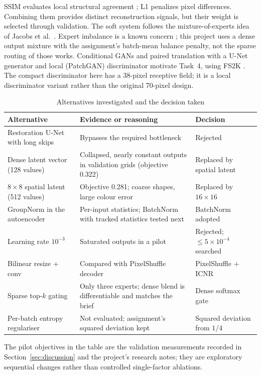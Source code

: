 \documentclass[conference]{IEEEtran}
\begin{document}
SSIM evaluates local structural agreement \cite{wang}; L1 penalizes pixel
differences. Combining them provides distinct reconstruction signals, but their
weight is selected through validation. The soft system follows the mixture-of-experts
idea of Jacobs et al.\ \cite{jacobs}. Expert imbalance is a known concern
\cite{shazeer,switch}; this project uses a dense output mixture with the
assignment's batch-mean balance penalty, not the sparse routing of those works.
Conditional GANs \cite{gan,cgan} and paired translation with a U-Net generator
and local (PatchGAN) discriminator \cite{isola} motivate Task~4, using FS2K
\cite{fs2kpaper}. The compact discriminator here has a 38-pixel receptive
field; it is a local discriminator variant rather than the original 70-pixel design.

\begin{table}[!ht]\centering\caption{Alternatives investigated and the decision taken}\scriptsize
\renewcommand{\arraystretch}{1.12}\begin{tabular}{>{\raggedright\arraybackslash}p{.25\linewidth}>{\raggedright\arraybackslash}p{.36\linewidth}>{\raggedright\arraybackslash}p{.24\linewidth}}\toprule
Alternative & Evidence or reasoning & Decision\\\midrule
Restoration U-Net with long skips & Bypasses the required bottleneck \cite{unet} & Rejected\\
Dense latent vector (128 values) & Collapsed, nearly constant outputs in validation grids (objective 0.322) & Replaced by spatial latent\\
$8{\times}8$ spatial latent (512 values) & Objective 0.281; coarse shapes, large colour error & Replaced by $16{\times}16$\\
GroupNorm in the autoencoder & Per-input statistics; BatchNorm \cite{batchnorm} with tracked statistics tested next & BatchNorm adopted\\
Learning rate $10^{-3}$ & Saturated outputs in a pilot & Rejected; $\le 5{\times}10^{-4}$ searched\\
Bilinear resize + conv & Compared with PixelShuffle decoder \cite{shi} & PixelShuffle + ICNR \cite{aitken}\\
Sparse top-$k$ gating \cite{shazeer} & Only three experts; dense blend is differentiable and matches the brief & Dense softmax gate\\
Per-batch entropy regulariser \cite{switch} & Not evaluated; assignment's squared deviation kept & Squared deviation from $1/4$\\\bottomrule
\end{tabular}\end{table}
The pilot objectives in the table are the validation measurements recorded
in Section~\ref{sec:discussion} and the project's research notes; they are
exploratory sequential changes rather than controlled single-factor ablations.
\end{document}
